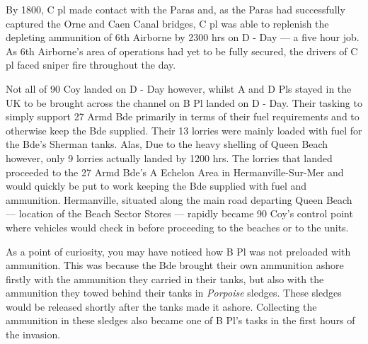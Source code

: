 \documentclass[noraggedright]{turabian-researchpaper}
\begin{document}
By 1800, C pl made contact with the Paras and, as the Paras had successfully
captured the Orne and Caen Canal bridges, C pl was able to replenish the 
depleting ammunition of 6th Airborne by 2300 hrs on D - Day --- a five hour
job.  As 6th Airborne's area of operations had yet to be fully secured, the
drivers of C pl faced sniper fire throughout the day.\autocite[6 June 1944]
{90wd}

Not all of 90 Coy landed on D - Day however, whilst A and D Pls stayed in the
UK to be brought across the channel on %
B Pl landed on D - Day.  
Their tasking to simply support 27 Armd Bde primarily in terms
of their fuel requirements and to otherwise keep the Bde supplied.  Their 13
lorries were mainly loaded with fuel for the Bde's Sherman tanks.  Alas,
Due to the heavy shelling of Queen Beach however, only 9 lorries actually 
landed by 1200 hrs.  The lorries that landed proceeded to the 27 Armd Bde's 
A Echelon Area in Hermanville-Sur-Mer and would quickly be put to work keeping
the Bde supplied with fuel and ammunition.\autocite[6 June 1944]{90wd}
Hermanville, situated along the main road departing Queen Beach --- location
of the Beach Sector Stores --- rapidly became 90 Coy's control point where
vehicles would check in before proceeding to the beaches or to the units.

As a point of
curiosity, you may have noticed how B Pl was not preloaded with ammunition.  
This was because the Bde brought their own ammunition ashore firstly with
the ammunition they carried in their tanks, but also with the ammunition 
they towed behind their tanks in \textit{Porpoise} sledges.\autocite[2--3]
{90wdjun}  These sledges
would be released shortly after the tanks made it ashore.  Collecting the
ammunition in these sledges also became one of B Pl's tasks in the first
hours of the invasion.%
\end{document}

